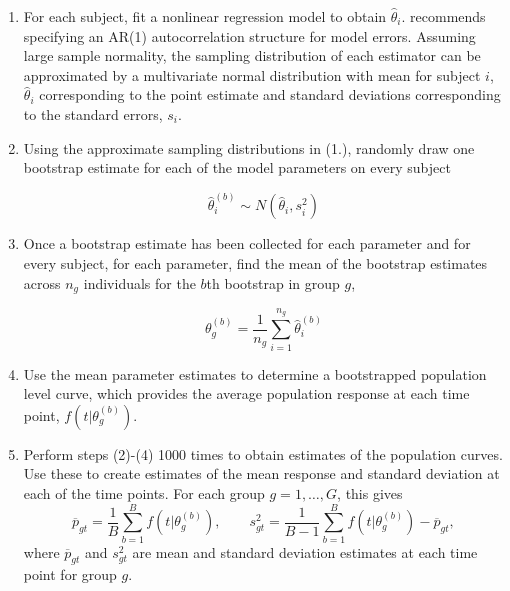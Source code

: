 \documentclass{article}
\begin{document}
\begin{enumerate}
\vspace{-3mm}
\item For each subject, fit a nonlinear regression model to obtain $\hat{\theta}_i$. \citet{oleson2017detecting} recommends specifying an AR(1) autocorrelation structure for model errors. Assuming large sample normality, the sampling distribution of each estimator can be approximated by a multivariate normal distribution with mean for subject $i$, $\hat{\theta}_i$ corresponding to the point estimate and standard deviations corresponding to the standard errors, $s_i$.

\item Using the approximate sampling distributions in (1.), randomly draw one bootstrap estimate for each of the model parameters on every subject 

\begin{equation}
\hat{\theta}_i^{(b)} \sim N( \hat{\theta}_i, s_i^2)
\end{equation}

\item Once a bootstrap estimate has been collected for each parameter and for every subject, for each parameter, find the mean of the bootstrap estimates across $n_g$ individuals for the $b$th bootstrap in group $g$,

\begin{equation}
\theta_g^{(b)} = \frac{1}{n_g} \sum_{i=1}^{n_g} \hat{\theta}_i^{(b)}
\end{equation}

\item Use the mean parameter estimates to determine a bootstrapped population level curve, which provides the average population response at each time point, $f(t| \theta_g^{(b)})$.

\item Perform steps (2)-(4) 1000 times to obtain estimates of the population curves. Use these to create estimates of the mean response and standard deviation at each of the time points. For each group $g = 1, \dots, G$, this gives
\begin{equation}
\overline{p}_{gt} = \frac1B \sum_{b=1}^B f(t| \theta_g^{(b)}), \qquad s_{gt}^2 = \frac{1}{B-1} \sum_{b=1}^B  f(t| \theta_g^{(b)}) - \overline{p}_{gt},
\end{equation}
where $\overline{p}_{gt}$ and $s_{gt}^2$ are mean and standard deviation estimates at each time point for group $g$.
\end{enumerate}
\end{document}
